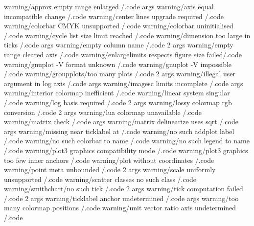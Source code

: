 warning/approx empty range enlarged              /.code args
warning/axis equal incompatible change           /.code
warning/center lines upgrade required            /.code
warning/colorbar CMYK unsupported                /.code
warning/colorbar uninitialised                   /.code
warning/cycle list size limit reached            /.code
warning/dimension too large in ticks             /.code args
warning/empty column name                        /.code 2 args
warning/empty range cleared axis                 /.code
warning/enlargelimits respects figure size failed/.code
warning/gnuplot -V format unknown                /.code
warning/gnuplot -V impossible                    /.code
warning/groupplots/too many plots                /.code 2 args
warning/illegal user argument in log axis        /.code args
warning/imagesc limits incomplete                /.code args
warning/interior colormap inefficient            /.code
warning/linear system singular                   /.code
warning/log basis required                       /.code 2 args
warning/lossy colormap rgb conversion            /.code 2 args
warning/lua colormap unavailable                 /.code
warning/matrix check                             /.code args
warning/matrix delinearize uses sqrt             /.code args
warning/missing near ticklabel at                /.code
warning/no such addplot label                    /.code
warning/no such colorbar to name                 /.code
warning/no such legend to name                   /.code
warning/plot3 graphics compatibility mode        /.code
warning/plot3 graphics too few inner anchors     /.code
warning/plot without coordinates                 /.code
warning/point meta unbounded                     /.code 2 args
warning/scale uniformly unsupported              /.code
warning/scatter classes no such class            /.code
warning/smithchart/no such tick                  /.code 2 args
warning/tick computation failed                  /.code 2 args
warning/ticklabel anchor undetermined            /.code args
warning/too many colormap positions              /.code
warning/unit vector ratio axis undetermined      /.code

